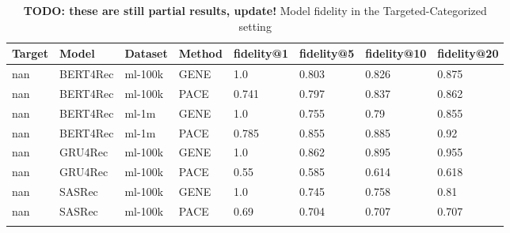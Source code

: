 \begingroup
    \setlength{\tabcolsep}{6pt} %
    \renewcommand{\arraystretch}{1.2} %
    \small %
    \begin{longtable}{|l|l|l|l|l|l|l|l|}
    \hline
\textbf{Target} & \textbf{Model} & \textbf{Dataset} & \textbf{Method} & \textbf{fidelity@1} & \textbf{fidelity@5} & \textbf{fidelity@10} & \textbf{fidelity@20} \\ \hline
\endhead
nan & BERT4Rec & ml-100k & GENE & 1.0 & 0.803 & 0.826 & 0.875 \\
nan & BERT4Rec & ml-100k & PACE & 0.741 & 0.797 & 0.837 & 0.862 \\\hline
nan & BERT4Rec & ml-1m & GENE & 1.0 & 0.755 & 0.79 & 0.855 \\
nan & BERT4Rec & ml-1m & PACE & 0.785 & 0.855 & 0.885 & 0.92 \\\hline
nan & GRU4Rec & ml-100k & GENE & 1.0 & 0.862 & 0.895 & 0.955 \\
nan & GRU4Rec & ml-100k & PACE & 0.55 & 0.585 & 0.614 & 0.618 \\\hline
nan & SASRec & ml-100k & GENE & 1.0 & 0.745 & 0.758 & 0.81 \\
nan & SASRec & ml-100k & PACE & 0.69 & 0.704 & 0.707 & 0.707 \\\hline
\caption{\textbf{TODO: these are still partial results, update!} Model fidelity in the Targeted-Categorized setting}
    \label{tab:eval_targ_cat}
    \end{longtable}
    \endgroup